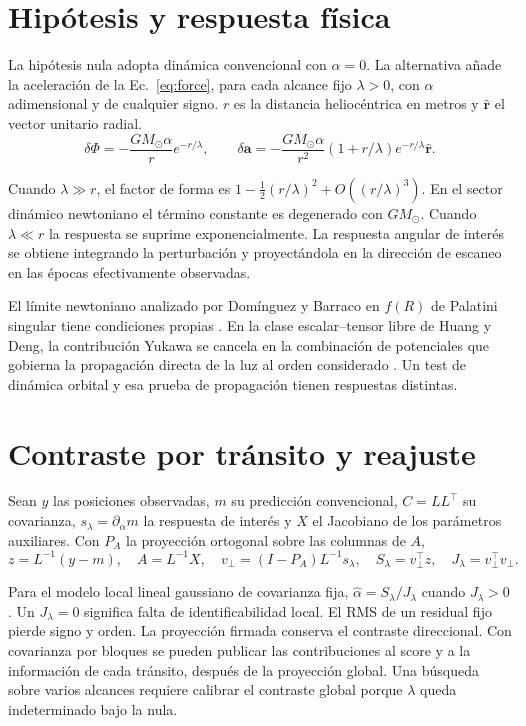 \documentclass[11pt,a4paper]{article}
\begin{document}
\section{Hipótesis y respuesta física}
La hipótesis nula adopta dinámica convencional con $\alpha=0$. La alternativa añade la aceleración de la Ec.~\eqref{eq:force}, para cada alcance fijo $\lambda>0$, con $\alpha$ adimensional y de cualquier signo. $r$ es la distancia heliocéntrica en metros y $\hat{\mathbf r}$ el vector unitario radial.
\begin{equation}
\delta\Phi=-\frac{GM_\odot\alpha}{r}e^{-r/\lambda},
\qquad
\delta\mathbf a=-\frac{GM_\odot\alpha}{r^2}
(1+r/\lambda)e^{-r/\lambda}\hat{\mathbf r}.
\label{eq:force}
\end{equation}

Cuando $\lambda\gg r$, el factor de forma es $1-\tfrac12(r/\lambda)^2+O((r/\lambda)^3)$. En el sector dinámico newtoniano el término constante es degenerado con $GM_\odot$. Cuando $\lambda\ll r$ la respuesta se suprime exponencialmente. La respuesta angular de interés se obtiene integrando la perturbación y proyectándola en la dirección de escaneo en las épocas efectivamente observadas.

El límite newtoniano analizado por Domínguez y Barraco en $f(R)$ de Palatini singular tiene condiciones propias \cite{barraco}. En la clase escalar--tensor libre de Huang y Deng, la contribución Yukawa se cancela en la combinación de potenciales que gobierna la propagación directa de la luz al orden considerado \cite{huang}. Un test de dinámica orbital y esa prueba de propagación tienen respuestas distintas.

\section{Contraste por tránsito y reajuste}
Sean $y$ las posiciones observadas, $m$ su predicción convencional, $C=LL^\top$ su covarianza, $s_\lambda=\partial_\alpha m$ la respuesta de interés y $X$ el Jacobiano de los parámetros auxiliares. Con $P_A$ la proyección ortogonal sobre las columnas de $A$,
\begin{equation}
z=L^{-1}(y-m),\quad A=L^{-1}X,\quad
v_\perp=(I-P_A)L^{-1}s_\lambda,\quad
S_\lambda=v_\perp^\top z,\quad J_\lambda=v_\perp^\top v_\perp .
\label{eq:score}
\end{equation}

Para el modelo local lineal gaussiano de covarianza fija, $\hat\alpha=S_\lambda/J_\lambda$ cuando $J_\lambda>0$. Un $J_\lambda=0$ significa falta de identificabilidad local. El RMS de un residual fijo pierde signo y orden. La proyección firmada conserva el contraste direccional. Con covarianza por bloques se pueden publicar las contribuciones al score y a la información de cada tránsito, después de la proyección global. Una búsqueda sobre varios alcances requiere calibrar el contraste global porque $\lambda$ queda indeterminado bajo la nula.
\end{document}
